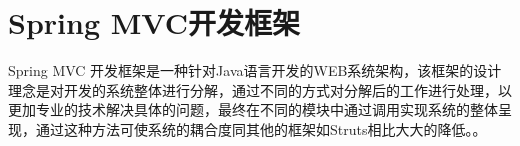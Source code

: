 

\section{Spring MVC开发框架}

Spring MVC 开发框架是一种针对Java语言开发的WEB系统架构，该框架的设计理念是对开发的系统整体进行分解，通过不同的方式对分解后的工作进行处理，以更加专业的技术解决具体的问题，最终在不同的模块中通过调用实现系统的整体呈现，通过这种方法可使系统的耦合度同其他的框架如Struts相比大大的降低。\cite{林薇2015基于}。

